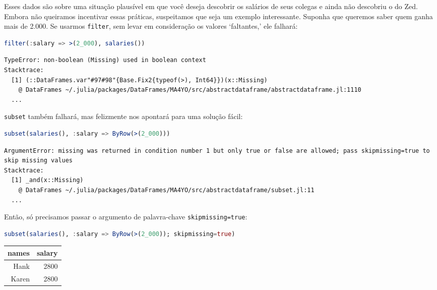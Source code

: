 \documentclass[
  notoc %
]{tufte-book}
\newcommand{\passthrough}[1]{#1}
\begin{document}
Esses dados são sobre uma situação plausível em que você deseja
descobrir os salários de seus colegas e ainda não descobriu o do Zed.
Embora não queiramos incentivar essas práticas, suspeitamos que seja um
exemplo interessante. Suponha que queremos saber quem ganha mais de
2.000. Se usarmos \passthrough{\lstinline!filter!}, sem levar em
consideração os valores `faltantes,' ele falhará:

\begin{lstlisting}[language=Julia]
filter(:salary => >(2_000), salaries())
\end{lstlisting}

\begin{lstlisting}[language=Output]
TypeError: non-boolean (Missing) used in boolean context
Stacktrace:
  [1] (::DataFrames.var"#97#98"{Base.Fix2{typeof(>), Int64}})(x::Missing)
    @ DataFrames ~/.julia/packages/DataFrames/MA4YO/src/abstractdataframe/abstractdataframe.jl:1110
  ...
\end{lstlisting}

\passthrough{\lstinline!subset!} também falhará, mas felizmente nos
apontará para uma solução fácil:

\begin{lstlisting}[language=Julia]
subset(salaries(), :salary => ByRow(>(2_000)))
\end{lstlisting}

\begin{lstlisting}[language=Output]
ArgumentError: missing was returned in condition number 1 but only true or false are allowed; pass skipmissing=true to skip missing values
Stacktrace:
  [1] _and(x::Missing)
    @ DataFrames ~/.julia/packages/DataFrames/MA4YO/src/abstractdataframe/subset.jl:11
  ...
\end{lstlisting}

Então, só precisamos passar o argumento de palavra-chave
\passthrough{\lstinline!skipmissing=true!}:

\begin{lstlisting}[language=Julia]
subset(salaries(), :salary => ByRow(>(2_000)); skipmissing=true)
\end{lstlisting}

\begin{longtable}[]{@{}rr@{}}
\toprule
names & salary \\
\midrule
\endhead
Hank & 2800 \\
Karen & 2800 \\
\bottomrule
\end{longtable}
\end{document}
